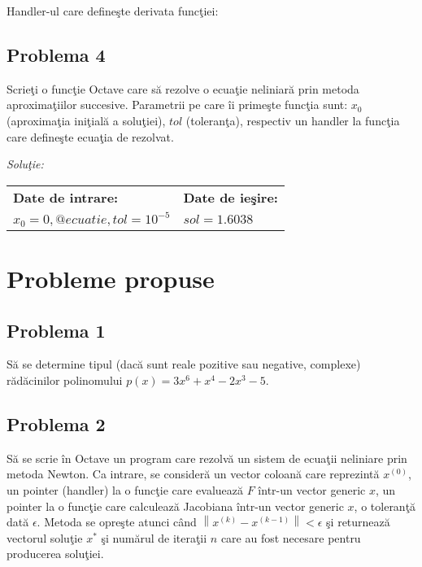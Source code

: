 \documentclass{exam}
\newcommand{\octavescript}[2]{
	
}
\begin{document}
Handler-ul care defineşte derivata funcţiei:

\octavescript{./src/ecDer.m}{Handler pentru derivata funcţiei.}

\subsection{Problema 4}
Scrieţi o funcţie Octave care să rezolve o ecuaţie neliniară  prin metoda aproximaţiilor succesive. Parametrii pe care îi primeşte funcţia sunt: $x_0$ (aproximaţia iniţială a soluţiei), $tol$ (toleranţa), respectiv un handler la funcţia care defineşte ecuaţia de rezolvat.

\textit{Soluţie:}

\octavescript{./src/aprox_succesive.m}{Metoda aproximaţiilor succesive.}

\begin{center}
	\begin{tabular}{| l | l |}
		\hline
		\textbf{Date de intrare:}            & \textbf{Date de ieşire:} \\
		$x_0 = 0, @ecuatie, tol = 10 ^ {-5}$ & $sol = 1.6038$           \\
		\hline
	\end{tabular}
\end{center}

\section{Probleme propuse}

\subsection{Problema 1}
Să se determine tipul (dacă sunt reale pozitive sau negative, complexe) rădăcinilor polinomului $p(x)=3x^{6}+x^{4}-2x^{3}-5$.

\subsection{Problema 2}
Să se scrie în Octave un program care rezolvă un sistem de ecuaţii neliniare prin metoda Newton. Ca intrare, se consideră un vector coloană care reprezintă $x^{(0)}$, un pointer (handler) la o funcţie care evaluează $F$ într-un vector generic $x$, un pointer la o funcţie care calculează Jacobiana într-un vector generic $x$, o toleranţă dată $\epsilon$. Metoda se opreşte atunci când  $\left \| x^{(k)}-x^{(k-1)} \right \|< \epsilon$ şi returnează vectorul soluţie $x^{*}$ şi numărul de iteraţii $n$ care au fost necesare pentru producerea soluţiei.
\end{document}
